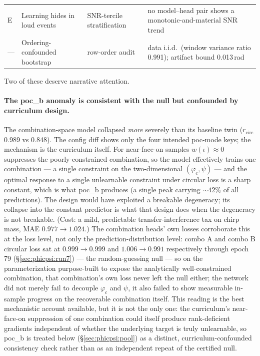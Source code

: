 \documentclass[11pt]{article}
\begin{document}
\begin{table}[tbp]
{\begin{tabular}{@{}llll@{}}
        E   & Learning hides in loud events       & SNR-tercile stratification            & no model--head pair shows a monotonic-and-material SNR trend                                                                                                                                         \\
        --- & Ordering-confounded bootstrap       & row-order audit                       & data i.i.d.\ (window variance ratio 0.991); artifact bound 0.013\,rad                                                                                                                                \\
        \bottomrule
    \end{tabular}
    }
\end{table}

Two of these deserve narrative attention.

\paragraph{The poc\_b anomaly is consistent with the null but confounded by curriculum design.}
The combination-space model collapsed \emph{more} severely than its baseline twin ($r_{\mathrm{circ}}$ 0.989 vs 0.848).
The config diff shows only the four intended poc-mode keys; the mechanism is the curriculum itself.
For near-face-on samples $w(\iota) \approx 0$ suppresses the poorly-constrained combination, so the model effectively trains one combination --- a single constraint on the two-dimensional $(\varphi_c, \psi)$ --- and the optimal response to a single unlearnable constraint under circular loss is a sharp constant, which is what poc\_b produces (a single peak carrying ${\sim}42\%$ of all predictions).
The design would have exploited a breakable degeneracy; its collapse into the constant predictor is what that design does when the degeneracy is not breakable.
(Cost: a mild, predictable transfer-interference tax on chirp mass, MAE $0.977 \to 1.024$.)
The combination heads' own losses corroborate this at the loss level, not only the prediction-distribution level: combo A and combo B circular loss sat at $0.999 \to 0.999$ and $1.006 \to 0.991$ respectively through epoch 79 (\S\ref{sec:phicpsi:run7}) --- the random-guessing null --- so on the parameterization purpose-built to expose the analytically well-constrained combination, that combination's own loss never left the null either; the network did not merely fail to decouple $\varphi_c$ and $\psi$, it also failed to show measurable in-sample progress on the recoverable combination itself.
This reading is the best mechanistic account available, but it is not the only one: the curriculum's near-face-on suppression of one combination could itself produce rank-deficient gradients independent of whether the underlying target is truly unlearnable, so poc\_b is treated below (\S\ref{sec:phicpsi:pool}) as a distinct, curriculum-confounded consistency check rather than as an independent repeat of the certified null.
\end{document}
